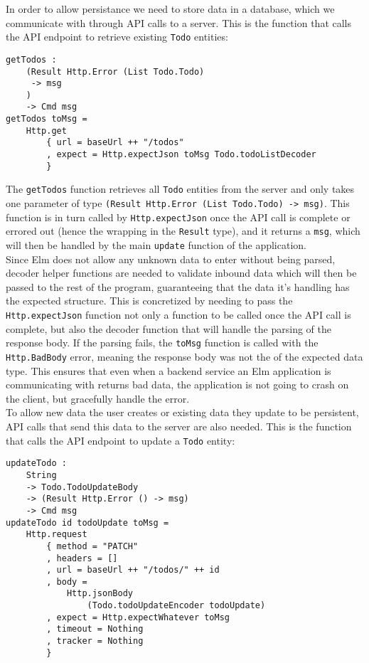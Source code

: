 In order to allow persistance we need to store data in a database, which we communicate with through API calls to a server. This is the function that calls the API endpoint to retrieve existing \texttt{Todo} entities:

\begin{verbatim}
getTodos :
    (Result Http.Error (List Todo.Todo)
     -> msg
    )
    -> Cmd msg
getTodos toMsg =
    Http.get
        { url = baseUrl ++ "/todos"
        , expect = Http.expectJson toMsg Todo.todoListDecoder
        }
\end{verbatim}

The \texttt{getTodos} function retrieves all \texttt{Todo} entities from the server and only takes one parameter of type \texttt{(Result Http.Error (List Todo.Todo) -> msg)}. This function is in turn called by \texttt{Http.expectJson} once the API call is complete or errored out (hence the wrapping in the \texttt{Result} type), and it returns a \texttt{msg}, which will then be handled by the main \texttt{update} function of the application.\\

Since Elm does not allow any unknown data to enter without being parsed, decoder helper functions are needed to validate inbound data which will then be passed to the rest of the program, guaranteeing that the data it's handling has the expected structure. This is concretized by needing to pass the \texttt{Http.expectJson} function not only a function to be called once the API call is complete, but also the decoder function that will handle the parsing of the response body. If the parsing fails, the \texttt{toMsg} function is called with the \texttt{Http.BadBody} error, meaning the response body was not the of the expected data type. This ensures that even when a backend service an Elm application is communicating with returns bad data, the application is not going to crash on the client, but gracefully handle the error.\\

To allow new data the user creates or existing data they update to be persistent, API calls that send this data to the server are also needed. This is the function that calls the API endpoint to update a \texttt{Todo} entity:

\begin{verbatim}
updateTodo :
    String
    -> Todo.TodoUpdateBody
    -> (Result Http.Error () -> msg)
    -> Cmd msg
updateTodo id todoUpdate toMsg =
    Http.request
        { method = "PATCH"
        , headers = []
        , url = baseUrl ++ "/todos/" ++ id
        , body =
            Http.jsonBody
                (Todo.todoUpdateEncoder todoUpdate)
        , expect = Http.expectWhatever toMsg
        , timeout = Nothing
        , tracker = Nothing
        }
\end{verbatim}


